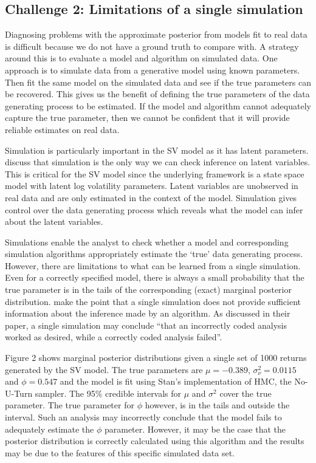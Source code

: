 \documentclass[12pt, a4paper]{article}
\begin{document}
\subsection{Challenge 2: Limitations of a single simulation}
    Diagnosing problems with the approximate posterior from models fit to real data is difficult because we do not have a ground truth to compare with. A strategy around this is to evaluate a model and algorithm on simulated data. One approach is to simulate data from a generative model using known parameters. Then fit the same model on the simulated data and see if the true parameters can be recovered. This gives us the benefit of defining the true parameters of the data generating process to be estimated. If the model and algorithm cannot adequately capture the true parameter, then we cannot be confident that it will provide reliable estimates on real data.

    Simulation is particularly important in the SV model as it has latent parameters. \citet{gelman2020bayesian} discuss that simulation is the only way we can check inference on latent variables. This is critical for the SV model since the underlying framework is a state space model with latent log volatility parameters. Latent variables are unobserved in real data and are only estimated in the context of the model. Simulation gives control over the data generating process which reveals what the model can infer about the latent variables. 

    Simulations enable the analyst to check whether a model and corresponding simulation algorithms appropriately estimate the `true' data generating process. However, there are limitations to what can be learned from a single simulation. Even for a correctly specified model, there is always a small probability that the true parameter is in the tails of the corresponding (exact) marginal posterior distribution. \cite{talts2020validating} make the point that a single simulation does not provide sufficient information about the inference made by an algorithm. As discussed in their paper, a single simulation may conclude ``that an incorrectly coded analysis worked as desired, while a correctly coded analysis failed''. 

    Figure 2 shows marginal posterior distributions given a single set of 1000 returns generated by the SV model. The true parameters are $\mu=-0.389$, $\sigma^2_{\nu}=0.0115$ and $\phi=0.547$ and the model is fit using Stan's implementation of HMC, the No-U-Turn sampler. The 95\% credible intervals for $\mu$ and $\sigma^2$ cover the true parameter. The true parameter for $\phi$ however, is in the tails and outside the interval. Such an analysis may incorrectly conclude that the model fails to adequately estimate the $\phi$ parameter. However, it may be the case that the posterior distribution is correctly calculated using this algorithm and the results may be due to the features of this specific simulated data set.
\end{document}
